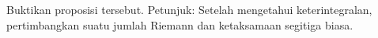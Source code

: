
\begin{exbox}
\begin{exercise}%
Buktikan proposisi tersebut. Petunjuk: Setelah mengetahui keterintegralan,
pertimbangkan suatu jumlah Riemann dan ketaksamaan segitiga biasa.
\end{exercise}
\end{exbox}

